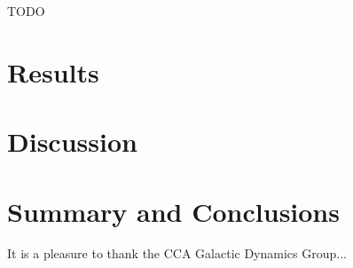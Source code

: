 TODO

\section{Results} \label{sec:results}


\section{Discussion} \label{sec:discussion}


\section{Summary and Conclusions} \label{sec:conclusions}


\begin{acknowledgements}

It is a pleasure to thank the CCA Galactic Dynamics Group...


\end{acknowledgements}






